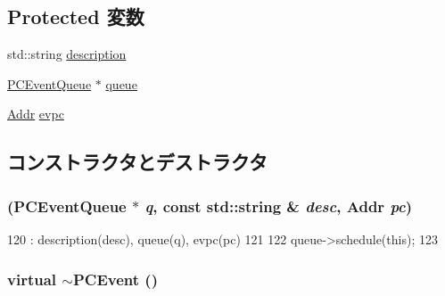 \subsection*{Protected 変数}
\begin{DoxyCompactItemize}
\item 
std::string \hyperlink{classPCEvent_a2e1454f6988673f814408646edaeb320}{description}
\item 
\hyperlink{classPCEventQueue}{PCEventQueue} $\ast$ \hyperlink{classPCEvent_ad4332d78b64319abad1ac79af25330c4}{queue}
\item 
\hyperlink{base_2types_8hh_af1bb03d6a4ee096394a6749f0a169232}{Addr} \hyperlink{classPCEvent_a2f62f1533392e0c5ea35f7553b4b175f}{evpc}
\end{DoxyCompactItemize}


\subsection{コンストラクタとデストラクタ}
\hypertarget{classPCEvent_a1b5a319c031d0e7aa4be20426ff7894e}{
\subsubsection[{PCEvent}]{ ({\bf PCEventQueue} $\ast$ {\em q}, \/  const std::string \& {\em desc}, \/  {\bf Addr} {\em pc})}}
\label{classPCEvent_a1b5a319c031d0e7aa4be20426ff7894e}



\begin{DoxyCode}
120     : description(desc), queue(q), evpc(pc)
121 {
122     queue->schedule(this);
123 }
\end{DoxyCode}
\hypertarget{classPCEvent_a47c2884f3487f915465e6f5481118860}{
\subsubsection[{$\sim$PCEvent}]{\setlength{\rightskip}{0pt plus 5cm}virtual $\sim${\bf PCEvent} ()}}
\label{classPCEvent_a47c2884f3487f915465e6f5481118860}



